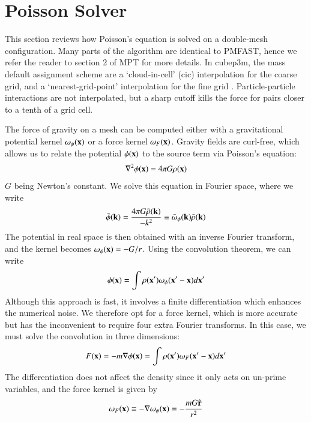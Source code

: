 \section{Poisson Solver}
\label{sec:Poisson}


This section reviews how Poisson's equation is solved on a double-mesh configuration. 
Many parts of the algorithm are identical to {\small PMFAST}, hence we refer the reader 
to section 2 of MPT for more details. In cubep3m, the mass default assignment scheme are
a `cloud-in-cell' (cic) interpolation for the coarse grid,  and a `nearest-grid-point' interpolation 
for the fine grid \citep{1981csup.book.....H}. Particle-particle interactions are not interpolated, but a sharp cutoff kills the force
for pairs closer to a tenth of a grid cell. 

The force of gravity on a mesh can be computed either with a gravitational potential  kernel $\omega_{\phi} ({\bf x})$
  or a force  kernel $\omega_{F} ({\bf x})$.
Gravity fields are curl-free, which allows us to relate the potential $\phi({\bf x})$ to the source term via Poisson's equation: 
\begin{eqnarray}
\nabla^{2}\phi({\bf x}) = 4 \pi G \rho({\bf x})
\label{eq:poisson}
\end{eqnarray}
$G$ being Newton's constant. We solve this equation in Fourier space, where we write
\begin{eqnarray}
 \tilde{\phi}({\bf k}) = \frac{4 \pi G \tilde{\rho}({\bf k})}{- k^{2}} \equiv \tilde{\omega}_{\phi}({\bf k})\tilde{\rho}({\bf k})
\label{eq:poissonFourier}
\end{eqnarray}
The potential in real space is then obtained with an inverse Fourier transform, and the kernel becomes $\omega_{\phi} ({\bf x}) = -G/r$.
Using the convolution theorem, we can write
\begin{eqnarray}
 \phi({\bf x}) = \int \rho({\bf x'}) \omega_{\phi}({\bf x'} - {\bf x}) d{\bf x'}
\label{eq:poisson_solution_pot}
\end{eqnarray}
Although this approach is fast, it involves a finite differentiation which enhances the numerical noise.
We therefore opt for a force kernel, which is more accurate but has the inconvenient to require four extra Fourier transforms.
In this case, we must solve the convolution in three dimensions:
\begin{eqnarray}
 F({\bf x}) = - m {\bf \nabla} \phi({\bf x})   = \int \rho({\bf x'}) {\bf  \omega}_{F}({\bf x'} - {\bf x}) d{\bf x'}                                      
\label{eq:poisson_solution_force}
\end{eqnarray}
The differentiation does not affect the density since it only acts on un-prime variables,
and the force kernel is given by 
\begin{eqnarray}
{\bf  \omega}_{F}({\bf x}) \equiv - {\bf \nabla}\omega_{\phi}({\bf x}) = - \frac{mG \hat{\bf r}}{r^{2}}
\end{eqnarray}


